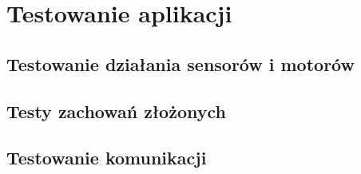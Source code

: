 \chapter{Testowanie aplikacji}
\label{ch:testowanie}

\section{Testowanie działania sensorów i motorów}

\section{Testy zachowań złożonych}

\section{Testowanie komunikacji}
